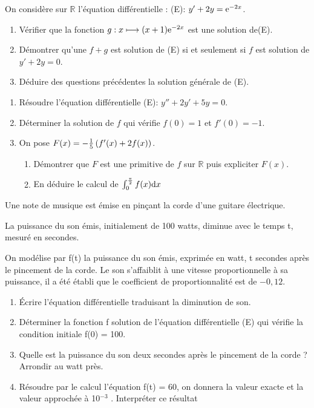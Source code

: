   \begin{exercice} 
  On considère sur $ \mathbb{R} $ l'équation différentielle : \;  (E): \;$  y'+2y=\mathrm{e}^{-2x}$.
 \begin{enumerate}
\item Vérifier que la fonction $ g : x\longmapsto (x+1)\mathrm{e}^{-2x}$ est une  solution de(E).
\item Démontrer  qu'une   $ f +g$  est solution de (E)   si et seulement si $ f$  est  solution de $y'+2y =0$.
\item Déduire des questions précédentes la solution générale de (E).
\end{enumerate}

\end{exercice}
  \begin{exercice} 
  \begin{enumerate}
\item Résoudre  l'équation différentielle (E): \! $  y''+2y'+5y=0 $.
\item  Déterminer la solution de  $ f $  qui vérifie \; $f(0)=1 $ et $ f'(0)=-1$.
\item On pose\;\; $ F(x)=-\frac{1}{5}\left(f'(x)+2f(x)\right) $. 
\begin{enumerate}
\item Démontrer que $ F $  est une primitive de $ f $ sur  $ \mathbb{R} $ puis  expliciter $  F(x) $.
\item En déduire le calcul de $ \int_{0}^{\frac{\pi}{2}}f(x){\rm d}x$
\end{enumerate}
\end{enumerate}

\end{exercice}
  \begin{exercice} 
  Une note de musique est émise en pinçant la corde d'une guitare électrique.
  
La puissance du son émis, initialement de 100 watts, diminue avec le temps t, mesuré en secondes.

On modélise par f(t) la puissance du son émis, exprimée en watt, t secondes après le pincement
de la corde. Le son s'affaiblit à une vitesse proportionnelle à sa puissance, il a été établi
que le coefficient de proportionnalité est de $ - 0,12$.
\begin{enumerate}
\item  Écrire l'équation différentielle traduisant la diminution de son.
\item  Déterminer la fonction f solution de l'équation différentielle (E) qui vérifie la condition
initiale f(0) = 100.
\item Quelle est la puissance du son deux secondes après le pincement de la corde ?
Arrondir au watt près.
\item  Résoudre par le calcul l'équation f(t) = 60, on donnera la valeur exacte
et la valeur approchée à 10$ ^{-3} $ . Interpréter ce résultat
\end{enumerate}
\end{exercice}
